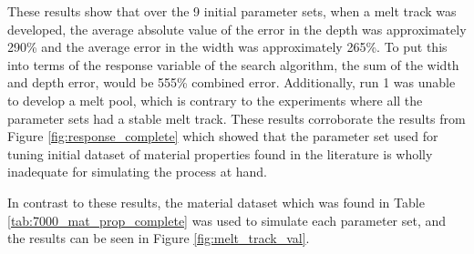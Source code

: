 \documentclass[pdflatex,sn-mathphys]{sn-jnl}
\begin{document}
	These results show that over the 9 initial parameter sets, when a melt track was developed, the average absolute value of the error in the depth was approximately 290\% and the average error in the width was approximately 265\%.  To put this into terms of the response variable of the search algorithm, the sum of the width and depth error, would be 555\% combined error.
	Additionally, run 1 was unable to develop a melt pool, which is contrary to the experiments where all the parameter sets had a stable melt track.  These results corroborate the results from Figure \ref{fig:response_complete} which showed that the parameter set used for tuning initial dataset of material properties found in the literature is wholly inadequate for simulating the process at hand. 
	
	In contrast to these results, the material dataset which was found in Table \ref{tab:7000_mat_prop_complete} was used to simulate each parameter set, and the results can be seen in Figure \ref{fig:melt_track_val}.
\end{document}
